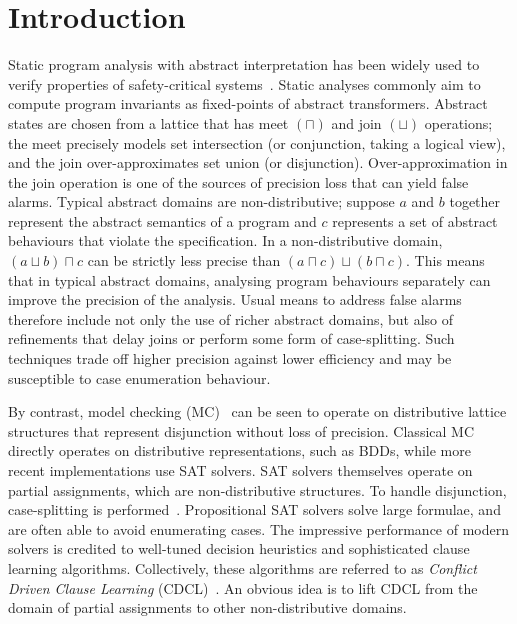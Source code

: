 \section{Introduction}

%
Static program analysis with abstract interpretation has been widely 
used to verify properties of safety-critical systems~\cite{CC77}.  
Static analyses commonly aim to compute program invariants as 
fixed-points of abstract transformers.  Abstract states are chosen 
from a lattice that has meet $(\sqcap)$ and join $(\sqcup)$ operations; 
the meet precisely models set intersection (or conjunction, taking a 
logical view), and the join over-approximates set union (or disjunction).  
Over-approximation in the join operation is one of the sources of 
precision loss that can yield false alarms.  Typical abstract domains 
are non-distributive; suppose $a$ and $b$ together represent the
abstract semantics of a program and $c$ represents a set of abstract
behaviours that violate the specification.  In a non-distributive domain,
$(a \sqcup b) \sqcap c$ can be strictly less precise than $(a \sqcap c)
\sqcup (b \sqcap c)$.  This means that in typical abstract domains,
analysing program behaviours separately can improve the precision of the
analysis.  Usual means to address false alarms therefore include not only
the use of richer abstract domains, but also of refinements that delay joins
or perform some form of case-splitting.  Such techniques trade off higher
precision against lower efficiency and may be susceptible to case
enumeration behaviour.

By contrast, model checking (MC)~\cite{mc-book} can be seen to operate on
distributive lattice structures that represent disjunction without loss
of precision.  Classical MC directly operates on distributive
representations, such as BDDs, while more recent implementations use SAT
solvers.  SAT solvers themselves operate on partial assignments, which are
non-distributive structures.  To handle disjunction, case-splitting is
performed~\cite{sas12}.  Propositional SAT solvers solve large formulae, and
are often able to avoid enumerating cases.  The impressive performance of
modern solvers is credited to well-tuned decision heuristics and
sophisticated clause learning algorithms.  Collectively, these algorithms
are referred to as \emph{Conflict Driven Clause Learning}
(CDCL)~\cite{cdcl}.  An obvious idea is to lift CDCL from the domain of 
partial assignments to other non-distributive domains.

